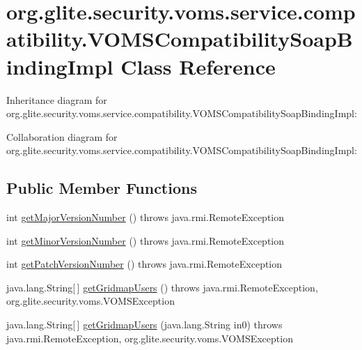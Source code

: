 \hypertarget{classorg_1_1glite_1_1security_1_1voms_1_1service_1_1compatibility_1_1VOMSCompatibilitySoapBindingImpl}{
\section{org.glite.security.voms.service.compatibility.VOMSCompatibilitySoapBindingImpl Class Reference}
\label{classorg_1_1glite_1_1security_1_1voms_1_1service_1_1compatibility_1_1VOMSCompatibilitySoapBindingImpl}
}


Inheritance diagram for org.glite.security.voms.service.compatibility.VOMSCompatibilitySoapBindingImpl:


Collaboration diagram for org.glite.security.voms.service.compatibility.VOMSCompatibilitySoapBindingImpl:
\subsection*{Public Member Functions}
\begin{DoxyCompactItemize}
\item 
int \hyperlink{classorg_1_1glite_1_1security_1_1voms_1_1service_1_1compatibility_1_1VOMSCompatibilitySoapBindingImpl_a67edffd224d5e02d209a317fbbc0daaa}{getMajorVersionNumber} ()  throws java.rmi.RemoteException 
\item 
int \hyperlink{classorg_1_1glite_1_1security_1_1voms_1_1service_1_1compatibility_1_1VOMSCompatibilitySoapBindingImpl_af2f1a67366a5c4195ff0187be73155fa}{getMinorVersionNumber} ()  throws java.rmi.RemoteException 
\item 
int \hyperlink{classorg_1_1glite_1_1security_1_1voms_1_1service_1_1compatibility_1_1VOMSCompatibilitySoapBindingImpl_ae679b2a21299a0d3709a7cf6873cd6fb}{getPatchVersionNumber} ()  throws java.rmi.RemoteException 
\item 
java.lang.String\mbox{[}$\,$\mbox{]} \hyperlink{classorg_1_1glite_1_1security_1_1voms_1_1service_1_1compatibility_1_1VOMSCompatibilitySoapBindingImpl_a5c3cb43a289949a24121b33c5c40108e}{getGridmapUsers} ()  throws java.rmi.RemoteException, org.glite.security.voms.VOMSException 
\item 
java.lang.String\mbox{[}$\,$\mbox{]} \hyperlink{classorg_1_1glite_1_1security_1_1voms_1_1service_1_1compatibility_1_1VOMSCompatibilitySoapBindingImpl_a38cf25e4e1655c95bce949f268db1f02}{getGridmapUsers} (java.lang.String in0)  throws java.rmi.RemoteException, org.glite.security.voms.VOMSException 
\end{DoxyCompactItemize}


